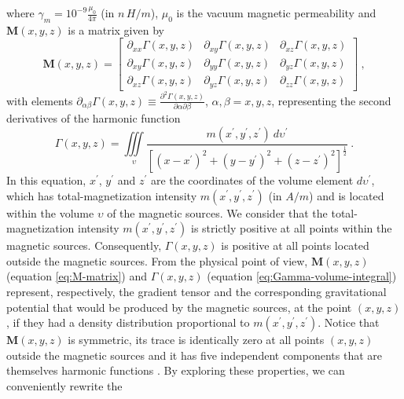 where $\gamma_{m} = 10^{-9} \frac{\mu_{0}}{4 \pi}$ (in $n \, H / m $), 
$\mu_{0}$ is the vacuum magnetic permeability and $\mathbf{M}(x, y, z)$ is a matrix 
given by
\begin{equation}
	\mathbf{M}(x, y, z) = \begin{bmatrix}
		\partial_{xx} \Gamma(x, y, z) & 
		\partial_{xy} \Gamma(x, y, z) &
		\partial_{xz} \Gamma(x, y, z) \\
		\partial_{xy} \Gamma(x, y, z) & 
		\partial_{yy} \Gamma(x, y, z) &
		\partial_{yz} \Gamma(x, y, z) \\
		\partial_{xz} \Gamma(x, y, z) & 
		\partial_{yz} \Gamma(x, y, z) &
		\partial_{zz} \Gamma(x, y, z)
	\end{bmatrix} \: ,
	\label{eq:M-matrix}
\end{equation}
with elements
$\partial_{\alpha\beta} \Gamma(x, y, z) \equiv 
\frac{\partial^{2} \Gamma(x, y, z)}{\partial \alpha \partial \beta}$, 
$\alpha, \beta = x, y, z$, representing the second derivatives of the harmonic
function
\begin{equation}
\Gamma(x, y, z) = \iiint\limits_{\upsilon} 
\frac{m(x^{\prime}, y^{\prime}, z^{\prime}) \: d\upsilon^{\prime}}
{\left[ (x-x^{\prime})^2 + (y-y^{\prime})^2 + (z-z^{\prime})^2 \right]^{\frac{1}{2}}} \: .
\label{eq:Gamma-volume-integral}
\end{equation}
In this equation, $x^{\prime}$, $y^{\prime}$ and $z^{\prime}$ are the coordinates 
of the volume element $d \upsilon^{\prime}$, which has total-magnetization intensity
$m(x^{\prime}, y^{\prime}, z^{\prime})$ (in $A/m$) and is located within the 
volume $\upsilon$ of the magnetic sources.
We consider that the total-magnetization intensity $m(x^{\prime}, y^{\prime}, z^{\prime})$
is strictly positive at all points within the magnetic sources. Consequently,
$\Gamma(x, y, z)$ is positive at all points located outside the magnetic sources.
From the physical point of view, $\mathbf{M}(x, y, z)$ (equation \ref{eq:M-matrix})
and $\Gamma(x, y, z)$ (equation \ref{eq:Gamma-volume-integral}) represent, respectively, 
the gradient tensor and the corresponding gravitational potential that would be produced by 
the magnetic sources, at the point $(x, y, z)$, if they had a density distribution proportional 
to $m(x^{\prime}, y^{\prime}, z^{\prime})$.
Notice that $\mathbf{M}(x, y, z)$ is symmetric, its trace is identically zero at all points 
$(x, y, z)$ outside the magnetic sources and it has five independent components that are 
themselves harmonic functions \citep{pedersen_rasmussen1990}.
By exploring these properties, we can conveniently rewrite the 
